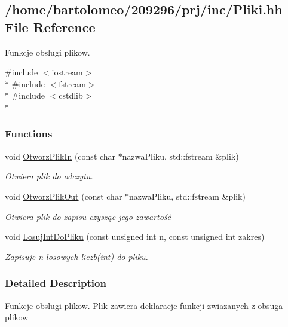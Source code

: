 \hypertarget{_pliki_8hh}{\subsection{/home/bartolomeo/209296/prj/inc/\-Pliki.hh File Reference}
\label{_pliki_8hh}
}


Funkcje obslugi plikow.  


{\ttfamily \#include $<$iostream$>$}\\*
{\ttfamily \#include $<$fstream$>$}\\*
{\ttfamily \#include $<$cstdlib$>$}\\*
\subsubsection*{Functions}
\begin{DoxyCompactItemize}
\item 
void \hyperlink{_pliki_8hh_a7d0919ede7db4ca9736507d9a45fe27a}{Otworz\-Plik\-In} (const char $\ast$nazwa\-Pliku, std\-::fstream \&plik)
\begin{DoxyCompactList}\small\item\em Otwiera plik do odczytu. \end{DoxyCompactList}\item 
void \hyperlink{_pliki_8hh_a1976927e700872e8ff9f9f3c5984ef16}{Otworz\-Plik\-Out} (const char $\ast$nazwa\-Pliku, std\-::fstream \&plik)
\begin{DoxyCompactList}\small\item\em Otwiera plik do zapisu czysząc jego zawartość \end{DoxyCompactList}\item 
void \hyperlink{_pliki_8hh_a44dbd9aa62dce80f83a68677db51bb19}{Losuj\-Int\-Do\-Pliku} (const unsigned int n, const unsigned int zakres)
\begin{DoxyCompactList}\small\item\em Zapisuje n losowych liczb(int) do pliku. \end{DoxyCompactList}\end{DoxyCompactItemize}


\subsubsection{Detailed Description}
Funkcje obslugi plikow. Plik zawiera deklaracje funkcji zwiazanych z obsuga plikow 

